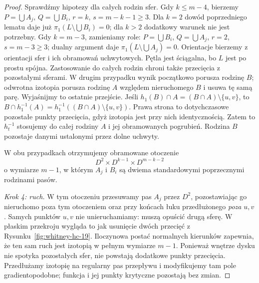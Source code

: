\begin{proof}
Sprawdźmy hipotezy dla całych rodzin sfer. Gdy $k\leq m-4$,
bierzemy $P=\bigcup A_j$, $Q=\bigcup B_i$,
$r=k$, $s=m-k-1\geq3$. Dla $k=2$ dowód poprzedniego lematu
daje już $\pi_1(L\setminus\bigcup B_i)=0$; dla $k>2$
dodatkowy warunek nie jest potrzebny. Gdy $k=m-3$,
zamieniamy role: $P=\bigcup B_i$, $Q=\bigcup A_j$,
$r=2$, $s=m-3\geq3$; dualny argument daje
$\pi_1(L\setminus\bigcup A_j)=0$.
Orientacje bierzemy z orientacji sfer i ich obramowań uchwytowych.
Pętla jest ściągalna, bo $L$ jest po prostu spójna.
Zastosowanie do całych rodzin chroni także przecięcia z pozostałymi
sferami. W drugim przypadku wynik początkowo porusza rodzinę $B$;
odwrotna izotopia porusza rodzinę $A$ względem nieruchomego $B$
i usuwa tę samą parę.
Wyjaśnijmy to ostatnie przejście. Jeśli
$h_1(B)\cap A=(B\cap A)\setminus\{u,v\}$, to
$B\cap h_1^{-1}(A)=h_1^{-1}((B\cap A)\setminus\{u,v\})$.
Prawa strona to dotychczasowe pozostałe punkty przecięcia,
gdyż izotopia jest przy nich identycznością.
Zatem to $h_t^{-1}$ stosujemy do całej rodziny $A$ i jej
obramowanych pogrubień. Rodzina $B$ pozostaje danymi
ustalonymi przez dolne uchwyty.

W obu przypadkach otrzymujemy obramowane
otoczenie
\[
 D^2\times D^{k-1}
       \times D^{m-k-2}
\]
o wymiarze $m-1$,
w którym $A_j$ i $B_i$
są dwiema standardowymi
poprzecznymi rodzinami pasów.

\emph{Krok 4: ruch.}
W tym otoczeniu przesuwamy
pas $A_j$ przez $D^2$,
pozostawiając go nieruchomo poza tym otoczeniem oraz przy końcach łuku
przedłużonego \emph{poza} $u,v$. Samych punktów $u,v$ nie
unieruchamiamy: muszą opuścić drugą sferę. W płaskim
przekroju wygląda to jak
usunięcie dwóch przecięć
z Rysunku~\ref{fig:whitney-hc-19}.
Iloczynowa postać normalnych
kierunków zapewnia,
że ten sam ruch jest izotopią
w pełnym wymiarze $m-1$.
Ponieważ wnętrze dysku
nie spotyka pozostałych sfer,
nie powstają dodatkowe
punkty przecięcia.
Przedłużamy izotopię
na regularny pas przepływu
i modyfikujemy tam pole
gradientopodobne; funkcja
i jej punkty krytyczne
pozostają bez zmian.
\end{proof}

